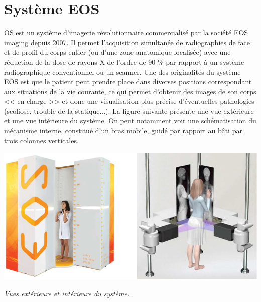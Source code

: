 \documentclass[10pt,fleqn]{article} %
\begin{document}

\vspace{7cm}
\pagestyle{fancy}
\thispagestyle{plain}

\def\columnseprulecolor{\color{ocre}}
\setlength{\columnseprule}{0.4pt} 




\section{Système EOS}
\noindent\begin{minipage}[c]{.65\linewidth}
OS est un système d’imagerie révolutionnaire commercialisé  par la société EOS imaging depuis 2007. Il permet l’acquisition  simultanée  de radiographies de face et de profil du corps entier (ou d’une zone anatomique localisée) avec une réduction de la dose de rayons X de l’ordre de 90 \% par rapport à un système radiographique conventionnel ou un scanner. Une des originalités  du système EOS est que le patient peut prendre  place dans diverses positions correspondant aux situations de la vie courante,  ce qui permet d’obtenir  des images de son corps << en charge >> et donc une visualisation plus précise d’éventuelles pathologies (scoliose, trouble de la statique...).
La figure suivante présente une vue extérieure et une vue intérieure du système. On peut notamment voir une schématisation du mécanisme interne, constitué d’un bras mobile, guidé par rapport au bâti par trois colonnes verticales. 
\end{minipage}\hfill
\begin{minipage}[c]{.32\linewidth}
\begin{center}
\includegraphics[width=\linewidth]{images_01/fig_01}

\textit{Vues extérieure et intérieure du système.}
\end{center}
\end{minipage}
\end{document}
